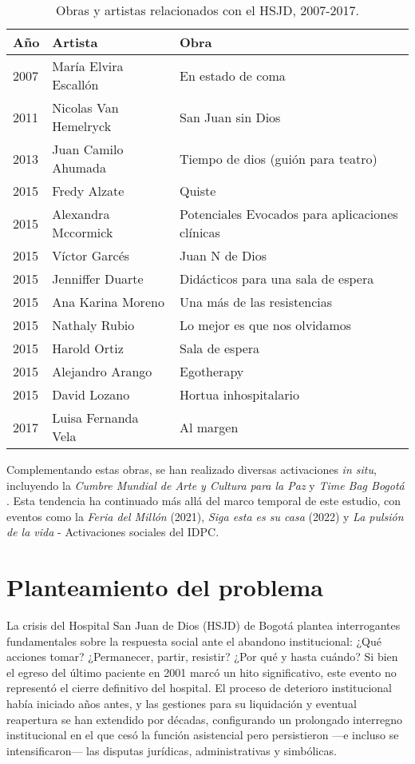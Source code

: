 \begin{table}[htbp]
\centering
\begin{tabular}{|l|l|l|}
\hline
\textbf{Año} & \textbf{Artista} & \textbf{Obra} \\ \hline
2007 & María Elvira Escallón & En estado de coma \\ \hline
2011 & Nicolas Van Hemelryck & San Juan sin Dios \\ \hline
2013 & Juan Camilo Ahumada & Tiempo de dios (guión para teatro) \\ \hline
2015 & Fredy Alzate & Quiste \\ \hline
2015 & Alexandra Mccormick & Potenciales Evocados para aplicaciones clínicas \\ \hline
2015 & Víctor Garcés & Juan N de Dios \\ \hline
2015 & Jenniffer Duarte & Didácticos para una sala de espera \\ \hline
2015 & Ana Karina Moreno & Una más de las resistencias \\ \hline
2015 & Nathaly Rubio & Lo mejor es que nos olvidamos \\ \hline
2015 & Harold Ortiz & Sala de espera \\ \hline
2015 & Alejandro Arango & Egotherapy \\ \hline
2015 & David Lozano & Hortua inhospitalario \\ \hline
2017 & Luisa Fernanda Vela & Al margen \\ \hline
\end{tabular}
\caption{Obras y artistas relacionados con el HSJD, 2007-2017.}
\label{tabla:obras_artistas}
\end{table}

Complementando estas obras, se han realizado diversas activaciones \textit{in situ}, incluyendo la \textit{Cumbre Mundial de Arte y Cultura para la Paz} y \textit{Time Bag Bogotá} \parencite{IDARTES2015}. Esta tendencia ha continuado más allá del marco temporal de este estudio, con eventos como la \textit{Feria del Millón} (2021), \textit{Siga esta es su casa} (2022) y \textit{La pulsión de la vida} - Activaciones sociales del IDPC.

\section*{Planteamiento del problema}

La crisis del Hospital San Juan de Dios (HSJD) de Bogotá plantea interrogantes fundamentales sobre la respuesta social ante el abandono institucional: ¿Qué acciones tomar? ¿Permanecer, partir, resistir? ¿Por qué y hasta cuándo? Si bien el egreso del último paciente en 2001 marcó un hito significativo, este evento no representó el cierre definitivo del hospital. El proceso de deterioro institucional había iniciado años antes, y las gestiones para su liquidación y eventual reapertura se han extendido por décadas, \textcolor{edit30sept}{configurando un prolongado interregno institucional en el que cesó la función asistencial pero persistieron —e incluso se intensificaron— las disputas jurídicas, administrativas y simbólicas.}

